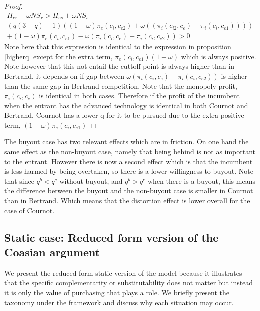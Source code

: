 \begin{proof}
\begin{align*}
\Pi_{er} + \omega NS_{r}
> \Pi_{es} + \omega NS_{s} \\
(q  (3-q)-1)((1-\omega)\pi_{e}(c_i,c_{e2})+\omega((\pi_{i}(c_{i2},c_{e})-\pi_{i}(c_i,c_{e1})))) \\
+(1-\omega)\pi_{e}(c_i,c_{e1})
-\omega(\pi_{i}(c_i,c_{e}) 
-\pi_{i}(c_{i},c_{e2}))>0
\end{align*} 
Note here that this expression is identical to the expression in proposition \ref{higherq} except for the extra term, $\pi_{e}(c_i,c_{e1})(1-\omega)$ which is always positive. Note however that this not entail the cuttoff point is always higher than in Bertrand, it depends on if gap between $\omega(\pi_{i}(c_i,c_{e}) 
-\pi_{i}(c_{i},c_{e2}))$ is higher than the same gap in Bertrand competition. Note that the monopoly profit,$\pi_{i}(c_i,c_{e})$ is identical in both cases. Therefore if the profit of the incumbent when the entrant has the advanced technology is identical in both Cournot and Bertrand, Cournot has a lower q for it to be pursued due to the extra positive term, $(1-\omega) \pi_e(c_i,c_{e1})$ 
\end{proof}

The buyout case has two relevant effects which are in friction. On one hand the same effect as the non-buyout case, namely that being behind is not as important to the entrant. However there is now a second effect which is that the incumbent is less harmed by being overtaken, so there is a lower willingness to buyout. Note that since $q^b<q^c$ without buyout, and $q^b>q^c$ when there is a buyout, this means the difference between the buyout and the non-buyout case is smaller in Cournot than in Bertrand. Which means that the distortion effect is lower overall for the case of Cournot. 

\subsection{Static case: Reduced form version of the Coasian argument}\label{static}

We present the reduced form static version of the model because it illustrates that the specific complementarity or substitutability does not matter but instead it is only the  value of purchasing that plays a role.  We briefly present the taxonomy under the framework and discuss why each situation may occur. 


